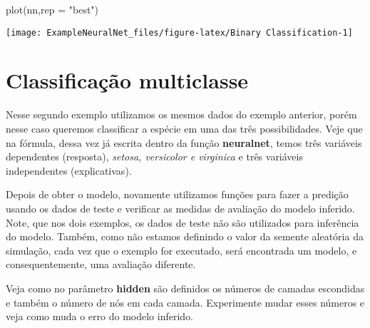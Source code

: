 \documentclass[
]{article}
\newenvironment{Shaded}{\begin{snugshade}}{\end{snugshade}}
\newcommand{\AttributeTok}[1]{\textcolor[rgb]{0.77,0.63,0.00}{#1}}
\newcommand{\FunctionTok}[1]{\textcolor[rgb]{0.00,0.00,0.00}{#1}}
\newcommand{\NormalTok}[1]{#1}
\newcommand{\StringTok}[1]{\textcolor[rgb]{0.31,0.60,0.02}{#1}}
\begin{document}
\begin{Shaded}
\begin{Highlighting}[]
\FunctionTok{plot}\NormalTok{(nn,}\AttributeTok{rep =} \StringTok{"best"}\NormalTok{)}
\end{Highlighting}
\end{Shaded}

\begin{center}\texttt{[image: ExampleNeuralNet\_files/figure-latex/Binary Classification-1]} \end{center}

\hypertarget{classificauxe7uxe3o-multiclasse}{%
\section{Classificação
multiclasse}\label{classificauxe7uxe3o-multiclasse}}

Nesse segundo exemplo utilizamos os mesmos dados do exemplo anterior,
porém nesse caso queremos classificar a espécie em uma das três
possibilidades. Veje que na fórmula, dessa vez já escrita dentro da
função \textbf{neuralnet}, temos três variáveis dependentes (resposta),
\emph{setosa, versicolor e virginica} e três variáveis independentes
(explicativas).

Depois de obter o modelo, novamente utilizamos funções para fazer a
predição usando os dados de teste e verificar as medidas de avaliação do
modelo inferido. Note, que nos dois exemplos, os dados de teste não são
utilizados para inferência do modelo. Também, como não estamos definindo
o valor da semente aleatória da simulação, cada vez que o exemplo for
executado, será encontrada um modelo, e consequentemente, uma avaliação
diferente.

Veja como no parâmetro \textbf{hidden} são definidos os números de
camadas escondidas e também o número de nós em cada camada. Experimente
mudar esses números e veja como muda o erro do modelo inferido.
\end{document}
